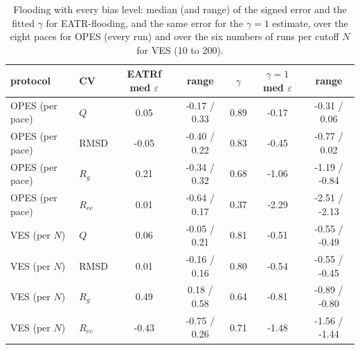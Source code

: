 \begin{table}[H]\centering
\caption{Flooding with every bias level: median (and range) of the signed error and the fitted $\gamma$ for EATR-flooding, and the same error for the $\gamma = 1$ estimate, over the eight paces for OPES (every run) and over the six numbers of runs per cutoff $N$ for VES (10 to 200).}\label{tab:s5}
\begin{tabular}{llccccc}\toprule
protocol & CV & EATRf med $\varepsilon$ & range & $\gamma$ & $\gamma=1$ med $\varepsilon$ & range\\ \midrule
OPES (per pace) & $Q$ & 0.05 & -0.17 / 0.33 & 0.89 & -0.17 & -0.31 / 0.06 \\
OPES (per pace) & RMSD & -0.05 & -0.40 / 0.22 & 0.83 & -0.45 & -0.77 / 0.02 \\
OPES (per pace) & $R_g$ & 0.21 & -0.34 / 0.32 & 0.68 & -1.06 & -1.19 / -0.84 \\
OPES (per pace) & $R_{ee}$ & 0.01 & -0.64 / 0.17 & 0.37 & -2.29 & -2.51 / -2.13 \\
VES (per $N$) & $Q$ & 0.06 & -0.05 / 0.21 & 0.81 & -0.51 & -0.55 / -0.49 \\
VES (per $N$) & RMSD & 0.01 & -0.16 / 0.16 & 0.80 & -0.54 & -0.55 / -0.45 \\
VES (per $N$) & $R_g$ & 0.49 & 0.18 / 0.58 & 0.64 & -0.81 & -0.89 / -0.80 \\
VES (per $N$) & $R_{ee}$ & -0.43 & -0.75 / 0.26 & 0.71 & -1.48 & -1.56 / -1.44\\ \bottomrule
\end{tabular}
\end{table}
